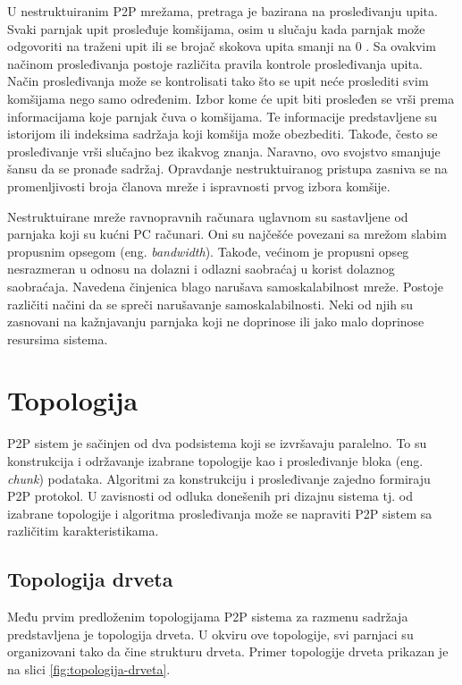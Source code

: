 \documentclass[12pt,oneside]{memoir}
\begin{document}
U nestruktuiranim P2P mrežama, pretraga je bazirana na prosleđivanju upita. Svaki parnjak upit prosleđuje komšijama, osim u slučaju kada parnjak može odgovoriti na traženi upit ili se brojač skokova upita smanji na 0 \cite{Shen:2009}. Sa ovakvim načinom prosleđivanja postoje različita pravila kontrole prosleđivanja upita. Način prosleđivanja može se kontrolisati tako što se upit neće proslediti svim komšijama nego samo određenim. Izbor kome će upit biti prosleđen se vrši prema informacijama koje parnjak čuva o komšijama. Te informacije predstavljene su istorijom ili indeksima sadržaja koji komšija može obezbediti. Takođe, često se prosleđivanje vrši slučajno bez ikakvog znanja. Naravno, ovo svojstvo smanjuje šansu da se pronađe sadržaj. 
Opravdanje nestruktuiranog pristupa zasniva se na promenljivosti broja članova mreže i ispravnosti prvog izbora komšije.

Nestruktuirane mreže ravnopravnih računara uglavnom su sastavljene od parnjaka koji su kućni PC računari. Oni su najčešće povezani sa mrežom slabim propusnim opsegom (eng. \textit{bandwidth}). Takođe, većinom je propusni opseg nesrazmeran u odnosu na dolazni i odlazni saobraćaj u korist dolaznog saobraćaja. Navedena činjenica blago narušava samoskalabilnost mreže. Postoje različiti načini da se spreči narušavanje samoskalabilnosti. Neki od njih su zasnovani na kažnjavanju parnjaka koji ne doprinose ili jako malo doprinose resursima sistema. 


\section{Topologija}
\label{P2P.3}

P2P sistem je sačinjen od dva podsistema koji se izvršavaju paralelno. To su konstrukcija i održavanje izabrane topologije kao i prosleđivanje bloka (eng. \textit{chunk}) podataka. Algoritmi za konstrukciju i prosleđivanje zajedno formiraju P2P protokol. U zavisnosti od odluka donešenih pri dizajnu sistema tj. od izabrane topologije i algoritma prosleđivanja može se napraviti P2P sistem sa različitim karakteristikama.

\subsection{Topologija drveta}
\label{P2P.3.1}

Među prvim predloženim topologijama P2P sistema za razmenu sadržaja predstavljena je topologija drveta. U okviru ove topologije, svi parnjaci su organizovani tako da čine strukturu drveta. Primer topologije drveta prikazan je na slici \ref{fig:topologija-drveta}.
 
\end{document}
